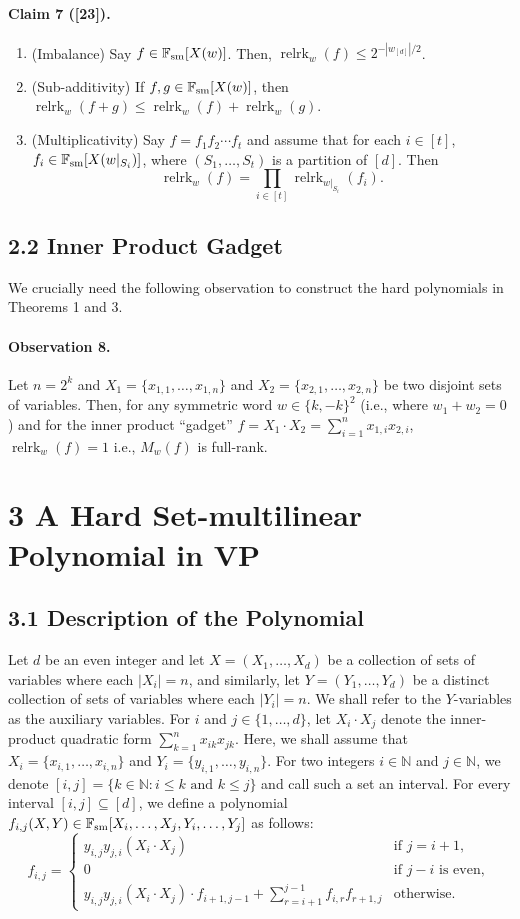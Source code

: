 \paragraph{Claim 7 ([23]).}
\begin{enumerate}
\item (Imbalance) Say $f\in\mathbb F_{\rm sm}[X(w)]$. Then, $\operatorname{relrk}_w(f)\leq2^{-|w_{[d]}|/2}$.
\item (Sub-additivity) If $f,g\in\mathbb F_{\rm sm}[X(w)]$, then $\operatorname{relrk}_w(f+g)\leq\operatorname{relrk}_w(f)+\operatorname{relrk}_w(g)$.
\item (Multiplicativity) Say $f=f_1f_2\cdots f_t$ and assume that for each $i\in[t]$, $f_i\in\mathbb F_{\rm sm}[X(w|_{S_i})]$, where $(S_1,\ldots,S_t)$ is a partition of $[d]$. Then
\[\operatorname{relrk}_w(f)=\prod_{i\in[t]}\operatorname{relrk}_{w|_{S_i}}(f_i).\]
\end{enumerate}
\subsection*{2.2 Inner Product Gadget}
We crucially need the following observation to construct the hard polynomials in Theorems 1 and 3.
\paragraph{Observation 8.} Let $n=2^k$ and $X_1=\{x_{1,1},\ldots,x_{1,n}\}$ and $X_2=\{x_{2,1},\ldots,x_{2,n}\}$ be two disjoint sets of variables. Then, for any symmetric word $w\in\{k,-k\}^2$ (i.e., where $w_1+w_2=0$) and for the inner product ``gadget'' $f=X_1\cdot X_2=\sum_{i=1}^n x_{1,i}x_{2,i}$, $\operatorname{relrk}_w(f)=1$ i.e., $M_w(f)$ is full-rank.
\section*{3 A Hard Set-multilinear Polynomial in VP}
\subsection*{3.1 Description of the Polynomial}
Let $d$ be an even integer and let $X=(X_1,\ldots,X_d)$ be a collection of sets of variables where each $|X_i|=n$, and similarly, let $Y=(Y_1,\ldots,Y_d)$ be a distinct collection of sets of variables where each $|Y_i|=n$. We shall refer to the $Y$-variables as the auxiliary variables. For $i$ and $j\in\{1,\ldots,d\}$, let $X_i\cdot X_j$ denote the inner-product quadratic form $\sum_{k=1}^n x_{ik}x_{jk}$. Here, we shall assume that $X_i=\{x_{i,1},\ldots,x_{i,n}\}$ and $Y_i=\{y_{i,1},\ldots,y_{i,n}\}$.
For two integers $i\in\mathbb N$ and $j\in\mathbb N$, we denote $[i,j]=\{k\in\mathbb N:i\leq k\text{ and }k\leq j\}$ and call such a set an interval. For every interval $[i,j]\subseteq[d]$, we define a polynomial $f_{i,j}(X,Y)\in\mathbb F_{\rm sm}[X_i,\ldots,X_j,Y_i,\ldots,Y_j]$ as follows:
\[f_{i,j}=\begin{cases}
y_{i,j}y_{j,i}(X_i\cdot X_j)&\text{if }j=i+1,\\
0&\text{if }j-i\text{ is even},\\
y_{i,j}y_{j,i}(X_i\cdot X_j)\cdot f_{i+1,j-1}+\displaystyle\sum_{r=i+1}^{j-1} f_{i,r}f_{r+1,j}&\text{otherwise}.
\end{cases}\]
